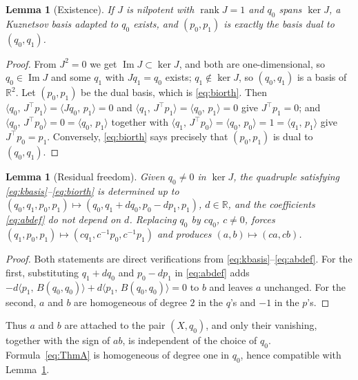 \documentclass[12pt]{article}
\theoremstyle{plain}
\newtheorem{lemma}[theorem]{Lemma}
\theoremstyle{definition}
\theoremstyle{remark}
\newcommand{\R}{\mathbb{R}}
\DeclareMathOperator{\rank}{rank}
\newcommand{\ip}[2]{\langle #1,\, #2\rangle}
\begin{document}
	\begin{lemma}[Existence]\label{lem:exists}
		If $J$ is nilpotent with $\rank J=1$ and $q_{0}$ spans $\ker J$, a
		Kuznetsov basis adapted to $q_{0}$ exists, and $(p_{0},p_{1})$ is
		exactly the basis dual to $(q_{0},q_{1})$.
	\end{lemma}
	
	\begin{proof}
		From $J^{2}=0$ we get $\operatorname{Im}J\subset\ker J$, and both are
		one-dimensional, so $q_{0}\in\operatorname{Im}J$ and some $q_{1}$ with
		$Jq_{1}=q_{0}$ exists; $q_{1}\notin\ker J$, so $(q_{0},q_{1})$ is a
		basis of $\R^{2}$.  Let $(p_{0},p_{1})$ be the dual basis, which is
		\eqref{eq:biorth}.  Then
		$\ip{q_{0}}{J^{\top}p_{1}}=\ip{Jq_{0}}{p_{1}}=0$ and
		$\ip{q_{1}}{J^{\top}p_{1}}=\ip{q_{0}}{p_{1}}=0$ give $J^{\top}p_{1}=0$;
		and $\ip{q_{0}}{J^{\top}p_{0}}=0=\ip{q_{0}}{p_{1}}$ together with
		$\ip{q_{1}}{J^{\top}p_{0}}=\ip{q_{0}}{p_{0}}=1=\ip{q_{1}}{p_{1}}$ give
		$J^{\top}p_{0}=p_{1}$.  Conversely, \eqref{eq:biorth} says precisely
		that $(p_{0},p_{1})$ is dual to $(q_{0},q_{1})$.
	\end{proof}
	
	\begin{lemma}[Residual freedom]\label{lem:scaling}
		Given $q_{0}\neq0$ in $\ker J$, the quadruple satisfying
		\eqref{eq:kbasis}--\eqref{eq:biorth} is determined up to
		$(q_{0},q_{1},p_{0},p_{1})\mapsto(q_{0},q_{1}+dq_{0},p_{0}-dp_{1},p_{1})$,
		$d\in\R$, and the coefficients \eqref{eq:abdef} do not depend on $d$.
		Replacing $q_{0}$ by $cq_{0}$, $c\neq0$, forces
		$(q_{1},p_{0},p_{1})\mapsto(cq_{1},c^{-1}p_{0},c^{-1}p_{1})$ and
		produces $(a,b)\mapsto(ca,cb)$.
	\end{lemma}
	
	\begin{proof}
		Both statements are direct verifications from
		\eqref{eq:kbasis}--\eqref{eq:abdef}.  For the first, substituting
		$q_{1}+dq_{0}$ and $p_{0}-dp_{1}$ in \eqref{eq:abdef} adds
		$-d\ip{p_{1}}{B(q_{0},q_{0})}+d\ip{p_{1}}{B(q_{0},q_{0})}=0$ to $b$ and
		leaves $a$ unchanged.  For the second, $a$ and $b$ are homogeneous of
		degree $2$ in the $q$'s and $-1$ in the $p$'s.
	\end{proof}
	
	Thus $a$ and $b$ are attached to the pair $(X,q_{0})$, and only their
	vanishing, together with the sign of $ab$, is independent of the choice
	of $q_{0}$.  Formula~\eqref{eq:ThmA} is homogeneous of degree one in
	$q_{0}$, hence compatible with Lemma~\ref{lem:scaling}.
	
\end{document}
